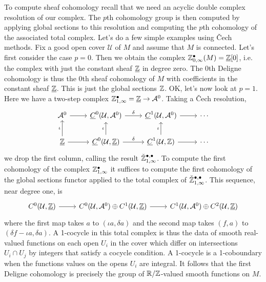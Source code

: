 \documentclass{amsart}
\begin{document}
To compute sheaf cohomology recall that we need an acyclic double complex resolution of our
complex. The $p$th cohomology group is then computed by applying global sections to this
resolution and computing the $p$th cohomology of the associated total complex. Let's do
a few simple examples using \v Cech methods. Fix a good open cover $\mathcal{U}$ of $M$
and assume that $M$ is connected.
Let's first consider the case $p=0$. Then we obtain the complex
$\mathbb{Z}_{0,\infty}^\bullet(M)=\underline{\mathbb{Z}}[0]$, i.e. the complex with just the constant sheaf
$\underline{\mathbb{Z}}$ in degree zero. The 0th Deligne cohomology is thus the 0th sheaf
cohomology of $M$ with coefficients in the constant sheaf $\underline{\mathbb{Z}}$. This is
just the global sections $\mathbb{Z}$. OK, let's now look
at $p=1$. Here we have a two-step complex
$\mathbb{Z}_{1,\infty}^\bullet=\underline{\mathbb{Z}}\to\mathcal{A}^0$.
Taking a \v Cech resolution,
\begin{equation*}
    \begin{tikzcd}
        \mathcal{A}^0 \rar & \underline{C}^0(\mathcal{U},\mathcal{A}^0)\rar{\delta} & \underline{C}^1(\mathcal{U},\mathcal{A}^0)\rar & \cdots\\
        \underline{\Z} \rar\uar{\iota} & \underline{C}^0(\mathcal{U},\underline{\Z}) \rar{\delta}\uar{\iota} & \underline{C}^1(\mathcal{U}, \mathcal{\Z})\rar\uar{\iota} & \cdots
    \end{tikzcd}
\end{equation*}
we drop the first column, calling the result $\check{\mathbb{Z}}_{1,\infty}^{\bullet,\bullet}$.
To compute the first cohomology of the complex $\mathbb{Z}_{1,\infty}^\bullet$ it suffices to
compute the first cohomology of the global sections functor applied to the total
complex of $\check{\mathbb{Z}}_{1,\infty}^{\bullet,\bullet}$. This sequence, near degree one, is
\begin{equation*}
    \begin{tikzcd}
        C^0(\mathcal{U},\underline{\Z}) \rar& C^0(\mathcal{U}, \mathcal{A}^0)\oplus C^1(\mathcal{U},\underline{\Z}) \rar & C^1(\mathcal{U},\mathcal{A}^0)\oplus C^2(\mathcal{U}, \underline{\Z})
    \end{tikzcd}
\end{equation*}
where the first map takes $a$ to $(\iota a, \delta a)$
and the second map takes $(f, a)$ to $(\delta f-\iota a, \delta a)$.
A 1-cocycle in this total complex is thus the data of smooth real-valued functions on
each open $U_i$ in the cover which differ on intersections $U_i\cap U_j$ by integers
that satisfy a cocycle condition. A 1-cocycle is a 1-coboundary when the functions
values on the opens $U_i$ are integral. It follows that the first Deligne cohomology
is precisely the group of $\mathbb{R}/\mathbb{Z}$-valued smooth functions on $M$.
\end{document}
